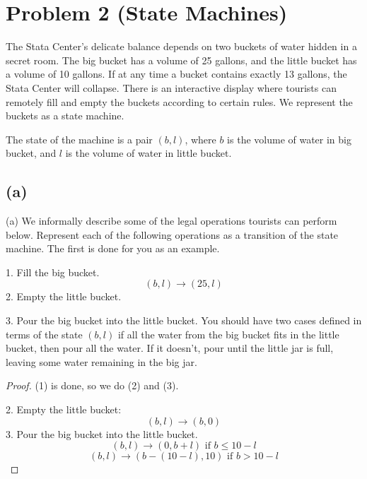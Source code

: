\documentclass[14pt]{extarticle}
\begin{document}
\section{Problem 2 (State Machines)}
The Stata Center’s delicate balance depends on two buckets of water hidden in a secret room. The big bucket has a volume of 25 gallons, and the little bucket has a volume of 10 gallons. If at any time a bucket contains exactly 13 gallons, the Stata Center will collapse. There is an interactive display where tourists can remotely fill and empty the buckets according to certain rules. We represent the buckets as a state machine. 

The state of the machine is a pair $(b, l)$, where $b$ is the volume of water in big bucket, and $l$ is the volume of water in little bucket.

\subsection{(a)}
(a) We informally describe some of the legal operations tourists can perform below. Represent each of the following operations as a transition of the state machine. The first is done for you as an example.

1. Fill the big bucket.
$$
(b, l) \to (25, l)
$$
2. Empty the little bucket.

3. Pour the big bucket into the little bucket. You should have two cases defined in terms of the state $(b, l)$ if all the water from the big bucket fits in the little bucket, then pour all the water. If it doesn’t, pour until the little jar is full, leaving some water remaining in the big jar.
\begin{proof}
(1) is done, so we do (2) and (3).

2. Empty the little bucket:
$$
(b,l) \to (b, 0)
$$
3. Pour the big bucket into the little bucket.
$$
(b,l) \to (0, b+l) \text{ if } b \leq 10 - l
$$
$$
(b,l) \to (b - (10 - l), 10) \text{ if } b > 10 - l
$$
\end{proof}
\end{document}
